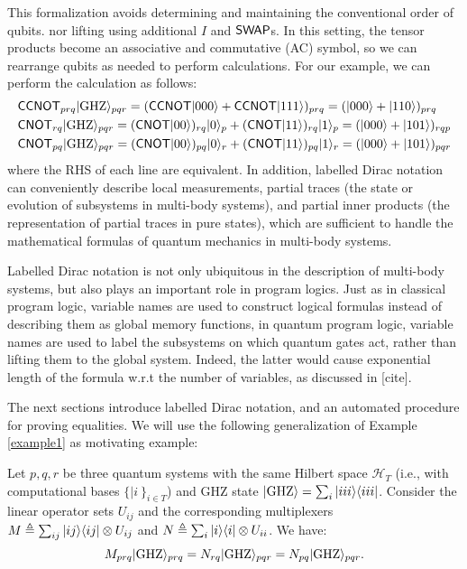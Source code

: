This formalization avoids determining and maintaining the conventional
order of qubits. nor lifting using additional $I$ and ${\mathsf{SWAP}}$s. In
this setting, the tensor products become an associative and
commutative (AC) symbol, so we can rearrange qubits as needed to
perform calculations. For our example, we can perform the calculation as
follows:
\begin{align*}
  &{\mathsf{CCNOT}}_{prq}|{\mathrm{GHZ}}\rangle_{pqr}
  = ({\mathsf{CCNOT}}|000\rangle + {\mathsf{CCNOT}}|111\rangle)_{prq}
  = (|000\rangle + |110\rangle)_{prq}\\
  &{\mathsf{CNOT}}_{rq}|{\mathrm{GHZ}}\rangle_{pqr}
  = ({\mathsf{CNOT}}|00\rangle)_{rq}|0\rangle_p + ({\mathsf{CNOT}}|11\rangle)_{rq}|1\rangle_p
  =(|000\rangle + |101\rangle)_{rqp}\\
  &{\mathsf{CNOT}}_{pq}|{\mathrm{GHZ}}\rangle_{pqr}
  = ({\mathsf{CNOT}}|00\rangle)_{pq}|0\rangle_r + ({\mathsf{CNOT}}|11\rangle)_{pq}|1\rangle_r
  = (|000\rangle + |101\rangle)_{pqr}
\end{align*}
where the RHS of each line are equivalent.  In addition, labelled
Dirac notation can conveniently describe local measurements, partial
traces (the state or evolution of subsystems in multi-body systems),
and partial inner products (the representation of partial traces in
pure states), which are sufficient to handle the mathematical formulas
of quantum mechanics in multi-body systems.

Labelled Dirac notation is not only ubiquitous in the description of multi-body systems, but also plays an important role in program logics. Just as in classical program logic, variable names are used to construct logical formulas instead of describing them as global memory functions, in quantum program logic, variable names are used to label the subsystems on which quantum gates act, rather than lifting them to the global system. Indeed, the latter would cause exponential length of the formula w.r.t the number of variables, as discussed in [cite].

The next sections introduce labelled Dirac notation, and an automated
procedure for proving equalities. We will use the following
generalization of Example \ref{example1} as motivating example:
\begin{example}
  \label{ex: motivating}
  Let $p,q,r$ be three quantum systems with the same Hilbert space \( \mathcal{H}_T \) (i.e., with computational bases $\{|i\>\}_{i\in T}$) and GHZ state $|{\mathrm{GHZ}}\rangle = \sum_i|iii\rangle\langle iii|$. Consider the linear operator sets $U_{ij}$ and the corresponding multiplexers $M\triangleq \sum_{ij}|ij\rangle\langle ij|\otimes U_{ij}$ and $N\triangleq \sum_i|i\rangle\langle i|\otimes U_{ii}$. We have:
  $$M_{prq}|{\mathrm{GHZ}}\rangle_{prq} = N_{rq}|{\mathrm{GHZ}}\rangle_{pqr} = N_{pq}|{\mathrm{GHZ}}\rangle_{pqr}.$$
\end{example}

